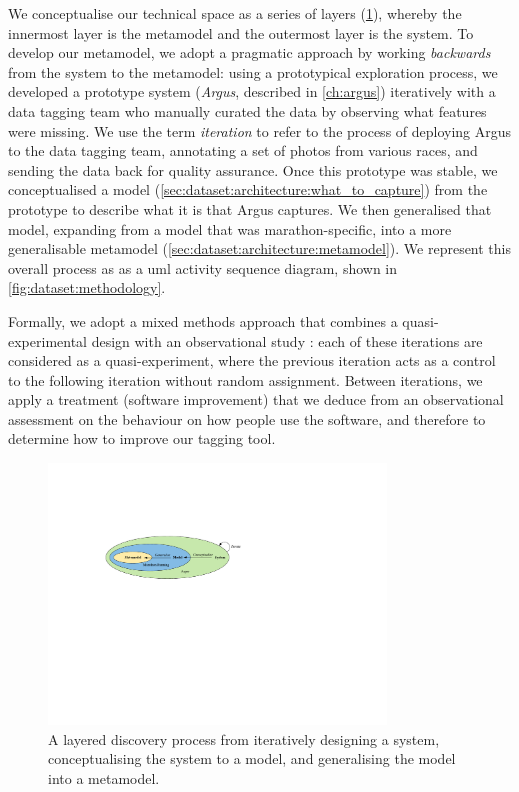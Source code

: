 We conceptualise our technical space as a series of layers (\cref{fig:dataset:layers}), whereby the innermost layer is the metamodel and the outermost layer is the system. To develop our metamodel, we adopt a pragmatic approach by working \textit{backwards} from the system to the metamodel: using a prototypical exploration process, we developed a prototype system (\textit{Argus}, described in \cref{ch:argus}) iteratively with a data tagging team who manually curated the data by observing what features were missing. We use the term \textit{iteration} to refer to the process of deploying Argus to the data tagging team, annotating a set of photos from various races, and sending the data back for quality assurance. Once this prototype was stable, we conceptualised a model (\cref{sec:dataset:architecture:what_to_capture}) from the prototype to describe what it is that Argus captures. We then generalised that model, expanding from a model that was marathon-specific, into a more generalisable metamodel (\cref{sec:dataset:architecture:metamodel}). We represent this overall process as as a \gls{uml} activity sequence diagram, shown in \cref{fig:dataset:methodology}.

Formally, we adopt a mixed methods approach that combines a quasi-experimental design with an observational study \citep{Trochim:2001wg,Gray:2013va}: each of these iterations are considered as a quasi-experiment, where the previous iteration acts as a control to the following iteration without random assignment. Between iterations, we apply a treatment (software improvement) that we deduce from an observational assessment on the behaviour on how people use the software, and therefore to determine how to improve our tagging tool.

\begin{figure}[h]
  \centering
  \includegraphics[width=0.8\textwidth]{images/dataset/layers}
  \caption[A layered approach to develop our metamodel]{A layered discovery process from iteratively designing a system, conceptualising the system to a model, and generalising the model into a metamodel.}
  \label{fig:dataset:layers}
\end{figure}

